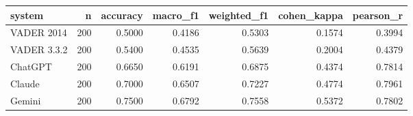 \begin{tabular}{lrrrrrr}
system & n & accuracy & macro\_f1 & weighted\_f1 & cohen\_kappa & pearson\_r \\
\hline
VADER 2014 & 200 & 0.5000 & 0.4186 & 0.5303 & 0.1574 & 0.3994 \\
VADER 3.3.2 & 200 & 0.5400 & 0.4535 & 0.5639 & 0.2004 & 0.4379 \\
ChatGPT & 200 & 0.6650 & 0.6191 & 0.6875 & 0.4374 & 0.7814 \\
Claude & 200 & 0.7000 & 0.6507 & 0.7227 & 0.4774 & 0.7961 \\
Gemini & 200 & 0.7500 & 0.6792 & 0.7558 & 0.5372 & 0.7802 \\
\end{tabular}
